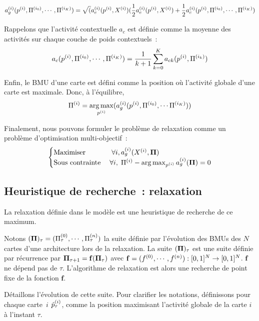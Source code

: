 \documentclass[../main]{subfiles}
\begin{document}
\begin{equation}
	a_g^{({i})}(p^{({i})},\Pi^{({i_0})}, \cdots, \Pi^{({i_K})}) = \sqrt(a_e^{({i})}(p^{({i})},X^{({i})})(\frac{1}{2}a_e^{({i})}(p^{({i})},X^{({i})}) + \frac{1}{2}a_c^{({i})}(p^{({i})},\Pi^{({i_0})}, \cdots, \Pi^{({i_K})})
\end{equation}

Rappelons que l'activité contextuelle $a_c$ est définie comme la moyenne des activités sur chaque couche de poids contextuels~:
\begin{equation}
	a_c(p^{({i})}, \Pi^{({i_0})}, \cdots, \Pi^{({i_K})}) = \frac{1}{k+1}\sum_{k=0}^{K}{a_{ck}(p^{({i})}, \Pi^{({i_k})})}
\end{equation}

Enfin, le BMU d'une carte est défini comme la position où l'activité globale d'une carte est maximale. Donc, à l'équilibre,
\begin{equation}
	\Pi^{({i})} = \operatorname*{arg\,max}_{p^{({i})}}(a_g^{({i})}(p^{({i})},\Pi^{({i_0})}, \cdots \Pi^{({i_K})}))
\end{equation}

Finalement, nous pouvons formuler le problème de relaxation comme un problème d'optimisation multi-objectif~:
\begin{equation}
\begin{cases}
	\text{Maximiser}&\; \forall i, a_g^{({i})}(X^{({i})}, \mathbf{\Pi}) \\
	\text{Sous contrainte}\;& \forall i, \; \Pi^{({i})} - \operatorname*{arg\,max}_{p^{({i})}}a_g^{({i})}(\mathbf{\Pi}) = 0
\end{cases}
\end{equation}

\subsection{Heuristique de recherche~: relaxation}

La relaxation définie dans le modèle est une heuristique de recherche de ce maximum.

Notons $(\mathbf{\Pi})_\tau = (\Pi^{({0})}_\tau,\cdots,\Pi^{({n})}_\tau)$ la suite définie par l'évolution des BMUs des $N$ cartes d'une architecture lors de la relaxation.
La suite $(\mathbf{\Pi})_\tau$ est une suite définie par récurrence par $\mathbf{\Pi}_{\tau+1} = \mathbf{f}(\mathbf{\Pi}_\tau)$ avec $\mathbf{f} = (f^{({0})},\cdots,f^{({n})}) : [0,1]^N \rightarrow [0,1]^N$. $\mathbf{f}$ ne dépend pas de $\tau$. 
L'algorithme de relaxation est alors une recherche de point fixe de la fonction $\mathbf{f}$.

Détaillons l'évolution de cette suite.
Pour clarifier les notations, définissons pour chaque carte~$i$ $\hat{p}^{({i})}_\tau$, comme la position maximisant l'activité globale de la carte $i$ à l'instant $\tau$.
\end{document}
